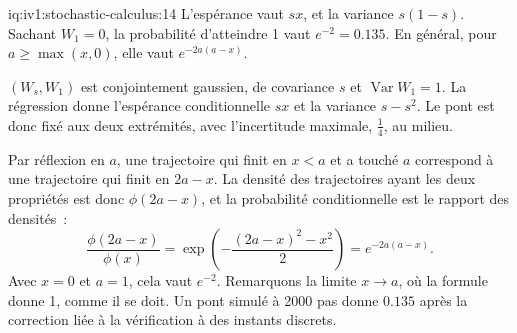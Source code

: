 \begin{solution}{iq:iv1:stochastic-calculus:14}
L'espérance vaut $sx$, et la variance $s(1 - s)$. Sachant $W_1 = 0$, la probabilité d'atteindre 1 vaut $e^{-2} = 0.135$. En général, pour $a \ge \max(x, 0)$, elle vaut $e^{-2a(a - x)}$.

$(W_s, W_1)$ est conjointement gaussien, de covariance $s$ et $\operatorname{Var}W_1 = 1$. La régression donne l'espérance conditionnelle $sx$ et la variance $s - s^2$. Le pont est donc fixé aux deux extrémités, avec l'incertitude maximale, $\frac14$, au milieu.

Par réflexion en $a$, une trajectoire qui finit en $x < a$ et a touché $a$ correspond à une trajectoire qui finit en $2a - x$. La densité des trajectoires ayant les deux propriétés est donc $\phi(2a - x)$, et la probabilité conditionnelle est le rapport des densités~:
\[
\frac{\phi(2a - x)}{\phi(x)} = \exp\left(-\frac{(2a - x)^2 - x^2}{2}\right) = e^{-2a(a - x)}.
\]
Avec $x = 0$ et $a = 1$, cela vaut $e^{-2}$. Remarquons la limite $x \to a$, où la formule donne 1, comme il se doit. Un pont simulé à 2000 pas donne $0.135$ après la correction liée à la vérification à des instants discrets.



\end{solution}

